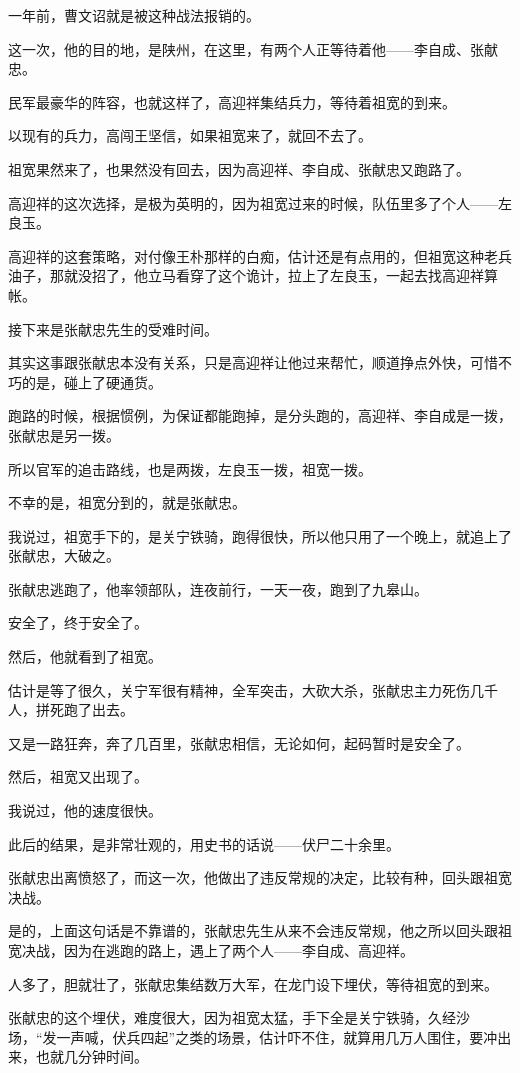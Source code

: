 \begin{multicols}{\theparacolNo}
一年前，曹文诏就是被这种战法报销的。

这一次，他的目的地，是陕州，在这里，有两个人正等待着他——李自成、张献忠。

民军最豪华的阵容，也就这样了，高迎祥集结兵力，等待着祖宽的到来。

以现有的兵力，高闯王坚信，如果祖宽来了，就回不去了。

祖宽果然来了，也果然没有回去，因为高迎祥、李自成、张献忠又跑路了。

高迎祥的这次选择，是极为英明的，因为祖宽过来的时候，队伍里多了个人——左良玉。

高迎祥的这套策略，对付像王朴那样的白痴，估计还是有点用的，但祖宽这种老兵油子，那就没招了，他立马看穿了这个诡计，拉上了左良玉，一起去找高迎祥算帐。

接下来是张献忠先生的受难时间。

其实这事跟张献忠本没有关系，只是高迎祥让他过来帮忙，顺道挣点外快，可惜不巧的是，碰上了硬通货。

跑路的时候，根据惯例，为保证都能跑掉，是分头跑的，高迎祥、李自成是一拨，张献忠是另一拨。

所以官军的追击路线，也是两拨，左良玉一拨，祖宽一拨。

不幸的是，祖宽分到的，就是张献忠。

我说过，祖宽手下的，是关宁铁骑，跑得很快，所以他只用了一个晚上，就追上了张献忠，大破之。

张献忠逃跑了，他率领部队，连夜前行，一天一夜，跑到了九皋山。

安全了，终于安全了。

然后，他就看到了祖宽。

估计是等了很久，关宁军很有精神，全军突击，大砍大杀，张献忠主力死伤几千人，拼死跑了出去。

又是一路狂奔，奔了几百里，张献忠相信，无论如何，起码暂时是安全了。

然后，祖宽又出现了。

我说过，他的速度很快。

此后的结果，是非常壮观的，用史书的话说——伏尸二十余里。

张献忠出离愤怒了，而这一次，他做出了违反常规的决定，比较有种，回头跟祖宽决战。

是的，上面这句话是不靠谱的，张献忠先生从来不会违反常规，他之所以回头跟祖宽决战，因为在逃跑的路上，遇上了两个人——李自成、高迎祥。

人多了，胆就壮了，张献忠集结数万大军，在龙门设下埋伏，等待祖宽的到来。

张献忠的这个埋伏，难度很大，因为祖宽太猛，手下全是关宁铁骑，久经沙场，“发一声喊，伏兵四起”之类的场景，估计吓不住，就算用几万人围住，要冲出来，也就几分钟时间。


\end{multicols}
